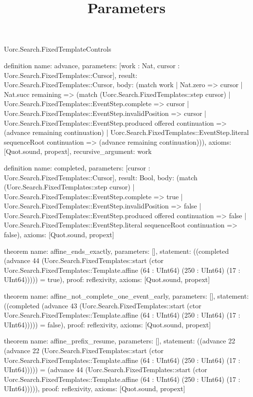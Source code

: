 \begin{lexlean}{Uorc.Search.FixedTemplateControls}
\title{Parameters}
\begin{semanticmodule}
definition{
  name: advance,
  parameters: [work : Nat, cursor : Uorc.Search.FixedTemplates::Cursor],
  result: Uorc.Search.FixedTemplates::Cursor,
  body: (match work
    | Nat.zero => cursor
    | Nat.succ remaining => (match (Uorc.Search.FixedTemplates::step cursor)
      | Uorc.Search.FixedTemplates::EventStep.complete => cursor
      | Uorc.Search.FixedTemplates::EventStep.invalidPosition => cursor
      | Uorc.Search.FixedTemplates::EventStep.produced offered continuation => (advance remaining continuation)
      | Uorc.Search.FixedTemplates::EventStep.literal sequenceRoot continuation => (advance remaining continuation))),
  axioms: [Quot.sound, propext],
  recursive_argument: work
}

definition{
  name: completed,
  parameters: [cursor : Uorc.Search.FixedTemplates::Cursor],
  result: Bool,
  body: (match (Uorc.Search.FixedTemplates::step cursor)
    | Uorc.Search.FixedTemplates::EventStep.complete => true
    | Uorc.Search.FixedTemplates::EventStep.invalidPosition => false
    | Uorc.Search.FixedTemplates::EventStep.produced offered continuation => false
    | Uorc.Search.FixedTemplates::EventStep.literal sequenceRoot continuation => false),
  axioms: [Quot.sound, propext]
}

theorem{
  name: affine_ends_exactly,
  parameters: [],
  statement: ((completed (advance 44 (Uorc.Search.FixedTemplates::start (ctor Uorc.Search.FixedTemplates::Template.affine (64 : UInt64) (250 : UInt64) (17 : UInt64))))) = true),
  proof: reflexivity{},
  axioms: [Quot.sound, propext]
}

theorem{
  name: affine_not_complete_one_event_early,
  parameters: [],
  statement: ((completed (advance 43 (Uorc.Search.FixedTemplates::start (ctor Uorc.Search.FixedTemplates::Template.affine (64 : UInt64) (250 : UInt64) (17 : UInt64))))) = false),
  proof: reflexivity{},
  axioms: [Quot.sound, propext]
}

theorem{
  name: affine_prefix_resume,
  parameters: [],
  statement: ((advance 22 (advance 22 (Uorc.Search.FixedTemplates::start (ctor Uorc.Search.FixedTemplates::Template.affine (64 : UInt64) (250 : UInt64) (17 : UInt64))))) = (advance 44 (Uorc.Search.FixedTemplates::start (ctor Uorc.Search.FixedTemplates::Template.affine (64 : UInt64) (250 : UInt64) (17 : UInt64))))),
  proof: reflexivity{},
  axioms: [Quot.sound, propext]
}


\end{semanticmodule}
\end{lexlean}

